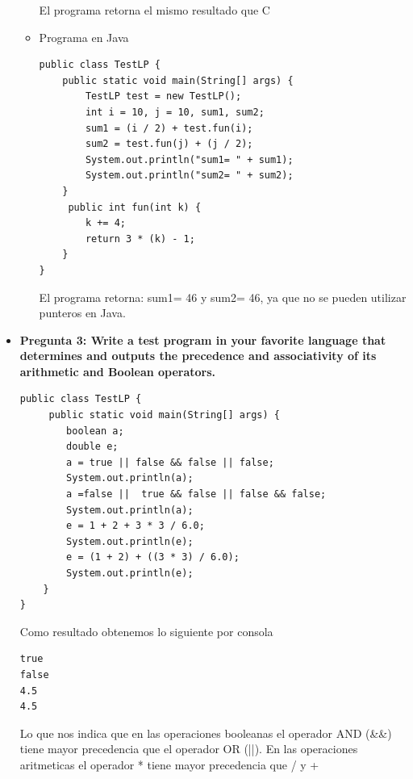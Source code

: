 \documentclass[12pt,oneside]{article}
\begin{document}
\begin{itemize}
\begin{itemize}
\begin{lstlisting}[frame = single]
							\end{lstlisting}
							El programa retorna el mismo resultado que C
						\item {Programa en Java}
\lstset{language = java} 
\begin{lstlisting}[frame=single]
public class TestLP {
    public static void main(String[] args) {
        TestLP test = new TestLP();
        int i = 10, j = 10, sum1, sum2;
        sum1 = (i / 2) + test.fun(i);
        sum2 = test.fun(j) + (j / 2);
        System.out.println("sum1= " + sum1);
        System.out.println("sum2= " + sum2);
    }    
     public int fun(int k) {
        k += 4;
        return 3 * (k) - 1;
    }
}
\end{lstlisting}
							El programa retorna: sum1= 46 y sum2= 46, ya que no se pueden utilizar punteros en Java.
					\end{itemize}
				\item {\bf Pregunta 3: Write a test program in your favorite language that determines and outputs the precedence and associativity of its arithmetic and Boolean operators.}
\begin{lstlisting}[frame=single]
public class TestLP { 
     public static void main(String[] args) {
        boolean a;
        double e;
        a = true || false && false || false;
        System.out.println(a);
        a =false ||  true && false || false && false;
        System.out.println(a);
        e = 1 + 2 + 3 * 3 / 6.0;
        System.out.println(e);
        e = (1 + 2) + ((3 * 3) / 6.0);   
        System.out.println(e);
    }
}
\end{lstlisting}
					Como resultado obtenemos lo siguiente por consola
\begin{lstlisting}[frame=single]
true
false
4.5
4.5
\end{lstlisting}
					Lo que nos indica que en las operaciones booleanas el operador AND (\&\&) tiene mayor precedencia que el operador OR (||). En las operaciones aritmeticas el operador * tiene mayor precedencia que / y + 
										

\end{itemize}
\end{document}
